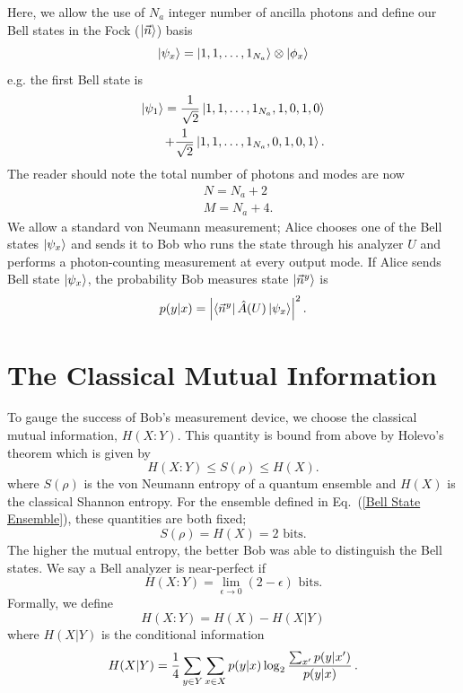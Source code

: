 \documentclass[aps,pra,twocolumn,showpacs,superscriptaddress,floatfix,10pt]{revtex4}
\begin{document}
Here, we allow the use of $N_a$ integer number of ancilla photons and define our Bell states in the Fock ($\ket{\vec{n}}$) basis
\begin{equation}
\label{Bell States Phi}
	\ket{\psi_x} = \ket{1,1,\dots,1_{N_a}} \otimes \ket{\phi_x}
\end{equation}
e.g. the first Bell state is
\begin{eqnarray}
	\ket{\psi_1} = \frac{1}{\sqrt{2}}  \ket{1,1,\dots,1_{N_a},1,0,1,0} \\
	+ \frac{1}{\sqrt{2}} \ket{1,1,\dots,1_{N_a},0,1,0,1}. \nonumber 
\end{eqnarray}
The reader should note the total number of photons and modes are now
\begin{eqnarray}
	& N = N_a + 2 \\
	& M = N_a + 4.
\end{eqnarray}
We allow a standard von Neumann measurement; Alice chooses one of the Bell states $\ket{\psi_x}$ and sends it to Bob who runs the state through his analyzer $U$ and performs a photon-counting measurement at every output mode.
If Alice sends Bell state $\ket{\psi_x}$, the probability Bob measures state $\ket{\vec{n}^y}$ is
\begin{equation}
	\label{Probability of Measurment}
	p( y | x ) = \abs{\bra{\vec{n}^y} \hat{A}(U) \ket{\psi_x}}^2 \, .
\end{equation}
\section{The Classical Mutual Information}
\label{Section on Mutual Entropy}
To gauge the success of Bob's measurement device, we choose the classical mutual information, $H(X:Y)$. This quantity is bound from above by Holevo's theorem which is
given by
\begin{equation}
\label{Holevo Theorem}
H(X:Y) \le S(\rho) \le H(X).
\end{equation}
where $S(\rho)$ is the von Neumann entropy of a quantum ensemble and $H(X)$ is the classical Shannon entropy.
For the ensemble defined in Eq.~(\ref{Bell State Ensemble}), these quantities are both fixed;
\begin{equation}
	S(\rho) = H(X) = \mbox{2 bits}.
\end{equation}
The higher the mutual entropy, the better Bob was able to distinguish the Bell states. We say a Bell analyzer is near-perfect if
\begin{equation}
	\label{Near Perfect Condition}
	H(X:Y) = \lim\limits_{\epsilon \rightarrow 0} (2 - \epsilon) \mbox{ bits.}
\end{equation}
Formally, we define
\begin{equation}
	\label{Mutual Entropy}
	H(X:Y) = H(X) - H(X|Y)
\end{equation}
where $H(X|Y)$ is the conditional information
\begin{equation}
\label{Conditional Entropy}
\small
H(X|Y) = \frac{1}{4} \sum_{y \in Y} \sum_{x \in X} p(y|x) \log_2 \frac{\sum_{x^\prime} p(y|x^\prime)}{p(y|x)}\,.
\end{equation}
\end{document}
